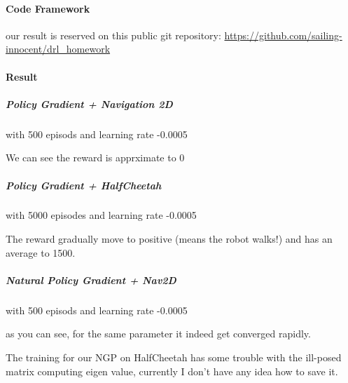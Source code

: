 \paragraph{Code Framework}

our result is reserved on this public git repository: \url{https://github.com/sailing-innocent/drl_homework}

\paragraph{Result}

\subparagraph{Policy Gradient + Navigation 2D} with 500 episods and learning rate -0.0005

We can see the reward is apprximate to 0

\subparagraph{Policy Gradient + HalfCheetah} with 5000 episodes and learning rate -0.0005

The reward gradually move to positive (means the robot walks!) and has an average to 1500.

\subparagraph{Natural Policy Gradient + Nav2D} with 500 episods and learning rate -0.0005

as you can see, for the same parameter it indeed get converged rapidly.

The training for our NGP on HalfCheetah has some trouble with
 the ill-posed matrix computing eigen value, 
 currently I don't have any idea how to save it.
